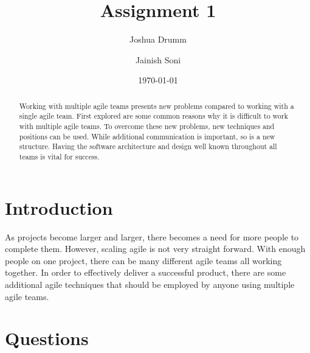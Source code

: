 \documentclass[sigplan,screen]{acmart}
\begin{document}
\title{Assignment 1}

\author{Joshua Drumm}

\author{Jainish Soni}

\date{\today}

\begin{abstract}
Working with multiple agile teams presents new problems compared to working with a single agile team. First explored are some common reasons why it is difficult to work with multiple agile teams. To overcome these new problems, new techniques and positions can be used. While additional communication is important, so is a new structure. Having the software architecture and design well known throughout all teams is vital for success.
\end{abstract}


\maketitle




\section{Introduction}
As projects become larger and larger, there becomes a need for more people to complete them. However, scaling agile is not very straight forward. With enough people on one project, there can be many different agile teams all working together. In order to effectively deliver a successful product, there are some additional agile techniques that should be employed by anyone using multiple agile teams.

\section{Questions}
\end{document}
